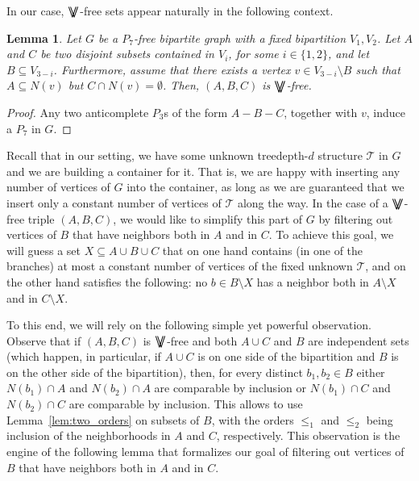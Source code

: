 \documentclass[11pt,a4paper]{article}
\newtheorem{lemma}[theorem]{Lemma}
\theoremstyle{definition}
\def\T{\mathcal{T}}
\newcommand{\VV}{$\bigvee\mkern-15mu\bigvee$}
\begin{document}
In our case, \VV-free sets appear naturally in the following context.
\begin{lemma}\label{lem:seagulls-to-P7}
Let $G$ be a $P_7$-free bipartite graph with a fixed bipartition $V_1,V_2$. 
Let $A$ and $C$ be two disjoint subsets contained in $V_i$, for some $i \in \{1,2\}$,
and let $B \subseteq V_{3-i}$.
Furthermore, assume that there exists a vertex $v \in V_{3 - i}\setminus B$ such that 
$A \subseteq N(v)$ but $C \cap N(v) = \emptyset$. Then, $(A,B,C)$ is \VV-free.
\end{lemma}
\begin{proof}
Any two anticomplete $P_3$s of the form $A-B-C$, together with $v$, induce a $P_7$ in $G$.
\end{proof}

Recall that in our setting, we have some unknown treedepth-$d$ structure $\T$ in $G$
and we are building a container for it. That is, we are happy with inserting any number
of vertices of $G$ into the container, as long as we are guaranteed that we insert only
a constant number of vertices of $\T$ along the way. 
In the case of a \VV-free triple $(A,B,C)$, we would like to simplify this
part of $G$ by filtering out vertices of $B$ that have neighbors both in $A$ and in $C$.
To achieve this goal, we will guess a set $X \subseteq A \cup B \cup C$ that
on one hand contains (in one of the branches) at most a constant number of vertices
of the fixed unknown $\T$, and on the other hand satisfies the following:
no $b \in B \setminus X$ has a neighbor both in $A \setminus X$ and in $C \setminus X$. 

To this end, we will rely on the following simple yet powerful observation. 
Observe that if $(A,B,C)$ is \VV-free and both $A \cup C$ and $B$ are independent sets
(which happen, in particular, if $A \cup C$ is on one side of the bipartition and $B$ is on the other side of the bipartition), then, for every distinct $b_1,b_2 \in B$
either $N(b_1) \cap A$ and $N(b_2) \cap A$ are comparable by inclusion
or $N(b_1) \cap C$ and $N(b_2) \cap C$ are comparable by inclusion. 
This allows to use Lemma~\ref{lem:two_orders} on subsets of $B$, with the orders
$\leq_1$ and $\leq_2$ being inclusion of the neighborhoods in $A$ and $C$, respectively. 
This observation is the engine of the following lemma
that formalizes our goal of filtering out vertices of $B$ that have neighbors both
in $A$ and in $C$. 
\end{document}
